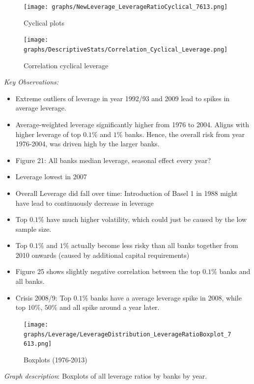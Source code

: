 \documentclass[12pt, a4paper]{article} %
\begin{document}
\begin{figure}[hbtp]
\centering
\caption{Cyclical plots}
\texttt{[image: graphs/NewLeverage\_LeverageRatioCyclical\_7613.png]}
\end{figure}



\begin{figure}[hbtp]
\centering
\caption{Correlation cyclical leverage}
\texttt{[image: graphs/DescriptiveStats/Correlation\_Cyclical\_Leverage.png]}
\end{figure}


\noindent \textit{Key Observations:}
\begin{itemize}
\item Extreme outliers of leverage in year 1992/93 and 2009 lead to spikes in average leverage.
\item Average-weighted leverage significantly higher from 1976 to 2004. Aligns with higher leverage of top $0.1\%$ and $1\%$ banks. Hence, the overall risk from year 1976-2004, was driven high by the larger banks. 
\item Figure 21: All banks median leverage, seasonal effect every year?
\item Leverage lowest in 2007
\item Overall Leverage did fall over time: Introduction of Basel 1 in 1988 might have lead to continuously decrease in leverage
\item Top $0.1\%$ have much higher volatility, which could just be caused by the low sample size.
\item Top $0.1\%$ and $1\%$ actually become less risky than all banks together from 2010 onwards (caused by additional capital requirements)
\item Figure 25 shows slightly negative correlation between the top $0.1\%$ banks and all banks. 
\item Crisis 2008/9: Top $0.1\%$ banks have a average leverage spike in 2008, while top $10\%$, $50\%$ and all  spike around a year later.  
\end{itemize}


\newpage

\begin{figure}[hbtp]
\centering
\caption{Boxplots (1976-2013)}
\texttt{[image: graphs/Leverage/LeverageDistribution\_LeverageRatioBoxplot\_7613.png]}
\end{figure}

\noindent \textit{Graph description}: Boxplots of all leverage ratios by banks by year. 
\\
\end{document}
